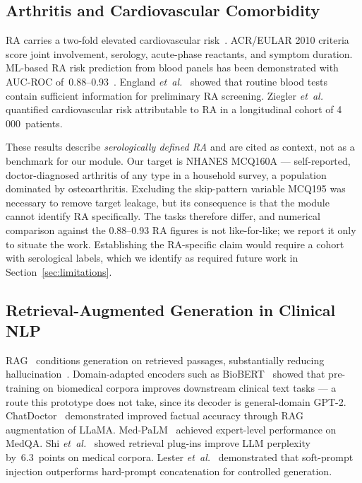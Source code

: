 \documentclass[AMA,STIX1COL,]{WileyNJD-v2}
\begin{document}
\subsection{Arthritis and Cardiovascular Comorbidity}

RA carries a two-fold elevated cardiovascular
risk~\cite{avinazubieta2008}. ACR/EULAR 2010 criteria~\cite{aletaha2010}
score joint involvement, serology, acute-phase reactants, and symptom
duration. ML-based RA risk prediction from blood panels has been
demonstrated with AUC-ROC of~0.88--0.93~\cite{tian2020}. England
\emph{et~al.}~\cite{england2018} showed that routine blood tests
contain sufficient information for preliminary RA screening. Ziegler
\emph{et~al.}~\cite{ziegler2010} quantified cardiovascular risk
attributable to RA in a longitudinal cohort of 4\,000~patients.

These results describe \emph{serologically defined RA} and are cited as
context, not as a benchmark for our module. Our target is NHANES
MCQ160A --- self-reported, doctor-diagnosed arthritis of any type in a
household survey, a population dominated by osteoarthritis. Excluding
the skip-pattern variable MCQ195 was necessary to remove target
leakage, but its consequence is that the module cannot identify RA
specifically. The tasks therefore differ, and numerical comparison
against the 0.88--0.93 RA figures is not like-for-like; we report it
only to situate the work. Establishing the RA-specific claim would
require a cohort with serological labels, which we identify as required
future work in Section~\ref{sec:limitations}.

\subsection{Retrieval-Augmented Generation in Clinical NLP}

RAG~\cite{lewis2020} conditions generation on retrieved passages,
substantially reducing hallucination~\cite{ji2023}.
Domain-adapted encoders such as BioBERT~\cite{lee2020biobert} showed
that pre-training on biomedical corpora improves downstream clinical
text tasks --- a route this prototype does not take, since its decoder
is general-domain GPT-2.
ChatDoctor~\cite{chatdoctor2023} demonstrated improved factual accuracy
through RAG augmentation of LLaMA. Med-PaLM~\cite{singhal2023} achieved
expert-level performance on MedQA. Shi \emph{et~al.}~\cite{shi2023}
showed retrieval plug-ins improve LLM perplexity by~6.3~points on
medical corpora. Lester \emph{et~al.}~\cite{lester2021} demonstrated
that soft-prompt injection outperforms hard-prompt concatenation for
controlled generation.
\end{document}
